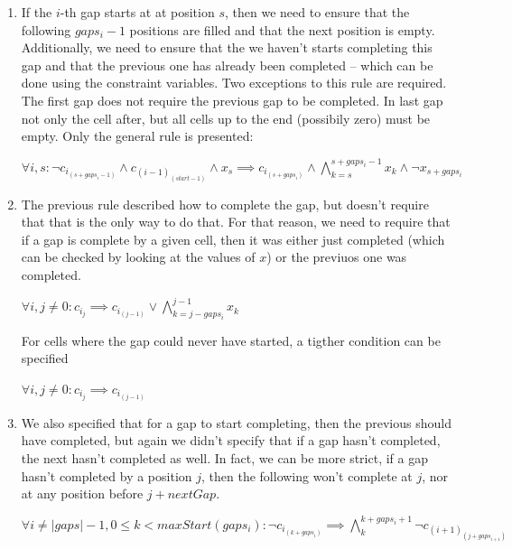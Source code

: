 \documentclass[12pt]{article}
\begin{document}
\begin{enumerate}
  \item If the $i$-th gap starts at at position $s$, then we need to ensure that the following $gaps_i - 1$ positions are filled and that the next position is empty.
      Additionally, we need to ensure that the we haven't starts completing this gap and that the previous one has already been completed -- which can be done using the constraint variables.
      Two exceptions to this rule are required.
      The first gap does not require the previous gap to be completed.
      In last gap not only the cell after, but all cells up to the end (possibily zero) must be empty.
      Only the general rule is presented:
      \begin{center}
        $\forall i, s: \neg c_{i}_{(s+gaps_i-1)} \wedge c_{(i-1)}_{(start-1)} \wedge x_s \implies c_{i}_{(s+gaps_i)} \wedge \bigwedge_{k=s}^{s+gaps_i-1} x_k \wedge \neg x_{s+gaps_i}$
      \end{center}


    \item The previous rule described how to complete the gap, but doesn't require that that is the only way to do that.
          For that reason, we need to require that if a gap is complete by a given cell, then it was either just completed (which can be checked by looking at the values of $x$) or the previuos one was completed.
          \begin{center}
            $\forall i, j \ne 0: c_{i}_{j} \implies c_{i}_{(j-1)} \vee \bigwedge_{k=j-gaps_i}^{j-1} x_k$
          \end{center}

          For cells where the gap could never have started, a tigther condition can be specified
          \begin{center}
            $\forall i, j \ne 0: c_{i}_{j} \implies c_{i}_{(j-1)}$
          \end{center}

  \item We also specified that for a gap to start completing, then the previous should have completed, but again we didn't specify that if a gap hasn't completed, the next hasn't completed as well. In fact, we can be more strict, if a gap hasn't completed by a position $j$, then the following won't complete at $j$, nor at any position before $j+nextGap$.

  \begin{center}
    $\forall i \ne |gaps|-1, 0 \le k < maxStart(gaps_i): \neg c_i_{(k+gaps_i)} \implies \bigwedge_k^{k+gaps_i+1} \neg c_{(i+1)}_{(j + gaps_{i+1})}$
  \end{center}


\end{enumerate}
\end{document}
